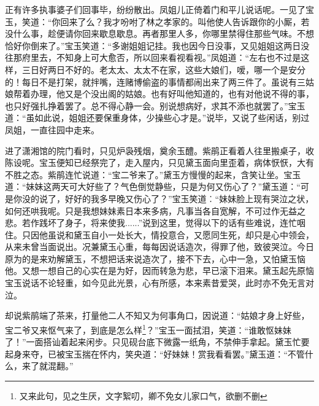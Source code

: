 \documentclass[12pt,oneside]{book}
\begin{document}
正有许多执事婆子们回事毕，纷纷散出。凤姐儿正倚着门和平儿说话呢。一见了宝玉，笑道：“你回来了么？我才吩咐了林之孝家的。叫他使人告诉跟你的小厮，若没什么事，趁便请你回来歇息歇息。再者那里人多，你哪里禁得住那些气味。不想恰好你倒来了。”宝玉笑道：“多谢姐姐记挂。我也因今日没事，又见姐姐这两日没往那府里去，不知身上可大愈否，所以回来看视看视。”凤姐道：“左右也不过是这样，三日好两日不好的。老太太、太太不在家，这些大娘们，嗳，哪一个是安分的！每日不是打架，就拌嘴，连赌博偷盗的事情都闹出来了两三件了。虽说有三姑娘帮着办理，他又是个没出阁的姑娘。也有好叫他知道的，也有对他说不得的事，也只好强扎挣着罢了。总不得心静一会。别说想病好，求其不添也就罢了。”宝玉道：“虽如此说，姐姐还要保重身体，少操些心才是。”说毕，又说了些闲话，别过凤姐，一直往园中走来。

进了潇湘馆的院门看时，只见炉袅残烟，奠余玉醴。紫鹃正看着人往里搬桌子，收陈设呢。宝玉便知已经祭完了，走入屋内，只见黛玉面向里歪着，病体恹恹，大有不胜之态。紫鹃连忙说道：“宝二爷来了。”黛玉方慢慢的起来，含笑让坐。宝玉道：“妹妹这两天可大好些了？气色倒觉静些，只是为何又伤心了？”黛玉道：“可是你没的说了，好好的我多早晚又伤心了？”宝玉笑道︰“妹妹脸上现有哭泣之状，如何还哄我呢。只是我想妹妹素日本来多病，凡事当各自宽解，不可过作无益之悲。若作践坏了身子，将来使我......”说到这里，觉得以下的话有些难说，连忙咽住。只因他虽说和黛玉自小一处长大，情投意合，又愿同生死，却只是心中领会，从来未曾当面说出。况兼黛玉心重，每每因说话造次，得罪了他，致彼哭泣。今日原为的是来劝解黛玉，不想把话来说造次了，接不下去，心中一急，又怕黛玉恼他。又想一想自己的心实在是为好，因而转急为悲，早已滚下泪来。黛玉起先原恼宝玉说话不论轻重，如今见此光景，心有所感，本来素昔爱哭，此时亦不免无言对泣。

却说紫鹃端了茶来，打量他二人不知又为何事角口，因说道：“姑娘才身上好些，宝二爷又来怄气来了，到底是怎么样\footnote{又来此句，见之生厌，文字絮叨，卿不免女儿家口气，欲删不删}？”宝玉一面拭泪，笑道：“谁敢怄妹妹了！”一面搭讪着起来闲步。只见砚台底下微露一纸角，不禁伸手拿起。黛玉忙要起身来夺，已被宝玉揣在怀内，笑央道：“好妹妹！赏我看看罢。”黛玉道：“不管什么，来了就混翻。”
\end{document}
